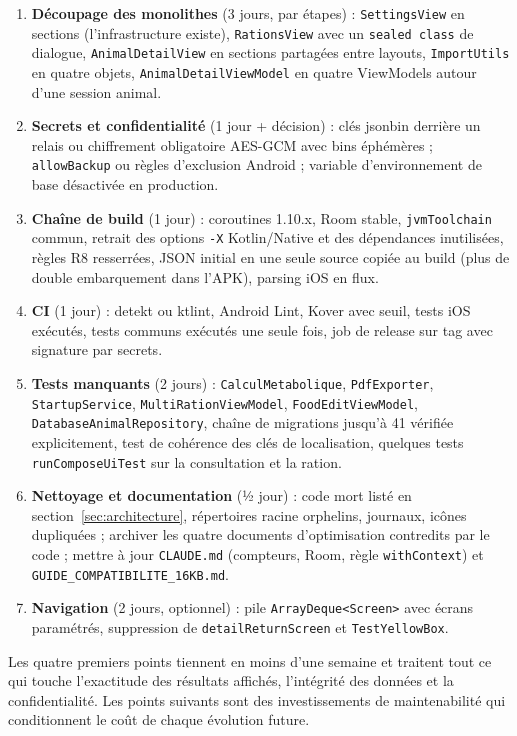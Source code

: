 \documentclass[11pt,a4paper]{article}
\newcommand{\fichier}[1]{\texttt{\small #1}}
\newcommand{\code}[1]{\texttt{#1}}
\newcommand{\sev}[1]{\textbf{#1}}
\begin{document}
\begin{enumerate}
  Export animal ; règle métier d'arrondi et calculs graphiques déplacés dans \fichier{Data/} ;
  base commune de ViewModel avec \code{clear()} et abandon de \code{: ViewModel()} sans store.
\item \sev{Découpage des monolithes} (3 jours, par étapes) : \code{SettingsView} en sections
  (l'infrastructure existe), \code{RationsView} avec un \code{sealed class} de dialogue,
  \code{AnimalDetailView} en sections partagées entre layouts, \code{ImportUtils} en quatre
  objets, \code{AnimalDetailViewModel} en quatre ViewModels autour d'une session animal.
\item \sev{Secrets et confidentialité} (1 jour + décision) : clés jsonbin derrière un relais ou
  chiffrement obligatoire AES-GCM avec bins éphémères ; \code{allowBackup} ou règles d'exclusion
  Android ; variable d'environnement de base désactivée en production.
\item \sev{Chaîne de build} (1 jour) : coroutines 1.10.x, Room stable, \code{jvmToolchain}
  commun, retrait des options \code{-X} Kotlin/Native et des dépendances inutilisées, règles R8
  resserrées, JSON initial en une seule source copiée au build (plus de double embarquement dans
  l'APK), parsing iOS en flux.
\item \sev{CI} (1 jour) : detekt ou ktlint, Android Lint, Kover avec seuil, tests iOS exécutés,
  tests communs exécutés une seule fois, job de release sur tag avec signature par secrets.
\item \sev{Tests manquants} (2 jours) : \code{CalculMetabolique}, \code{PdfExporter},
  \code{StartupService}, \code{MultiRationViewModel}, \code{FoodEditViewModel},
  \code{DatabaseAnimalRepository}, chaîne de migrations jusqu'à 41 vérifiée explicitement, test
  de cohérence des clés de localisation, quelques tests \code{runComposeUiTest} sur la consultation
  et la ration.
\item \sev{Nettoyage et documentation} (½ jour) : code mort listé en section~\ref{sec:architecture},
  répertoires racine orphelins, journaux, icônes dupliquées ; archiver les quatre documents
  d'optimisation contredits par le code ; mettre à jour \fichier{CLAUDE.md} (compteurs, Room,
  règle \code{withContext}) et \fichier{GUIDE\_COMPATIBILITE\_16KB.md}.
\item \sev{Navigation} (2 jours, optionnel) : pile \code{ArrayDeque<Screen>} avec écrans
  paramétrés, suppression de \code{detailReturnScreen} et \code{TestYellowBox}.
\end{enumerate}

Les quatre premiers points tiennent en moins d'une semaine et traitent tout ce qui touche
l'exactitude des résultats affichés, l'intégrité des données et la confidentialité. Les points
suivants sont des investissements de maintenabilité qui conditionnent le coût de chaque évolution
future.
\end{document}
